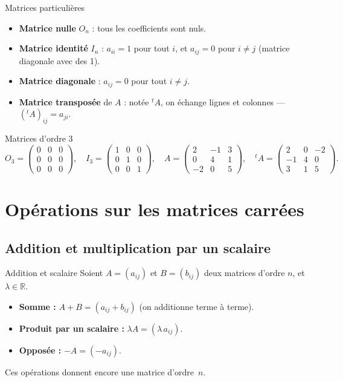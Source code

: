 \begin{definition}{Matrices particulières}
	\begin{itemize}
		\item \textbf{Matrice nulle} $O_n$ : tous les coefficients sont nuls.
		\item \textbf{Matrice identité} $I_n$ : $a_{ii}=1$ pour tout $i$,
		et $a_{ij}=0$ pour $i\neq j$ (matrice diagonale avec des 1).
		\item \textbf{Matrice diagonale} : $a_{ij}=0$ pour tout $i\neq j$.
		\item \textbf{Matrice transposée} de $A$ : notée ${}^tA$, on échange
		lignes et colonnes — $({}^tA)_{ij} = a_{ji}$.
	\end{itemize}
\end{definition}

\begin{exemple}{Matrices d'ordre 3}
	\[
	O_3 = \begin{pmatrix}0&0&0\\0&0&0\\0&0&0\end{pmatrix}, \quad
	I_3 = \begin{pmatrix}1&0&0\\0&1&0\\0&0&1\end{pmatrix}, \quad
	A   = \begin{pmatrix}2&-1&3\\0&4&1\\-2&0&5\end{pmatrix}, \quad
	{}^tA = \begin{pmatrix}2&0&-2\\-1&4&0\\3&1&5\end{pmatrix}.
	\]
\end{exemple}

\section{Opérations sur les matrices carrées}

\subsection{Addition et multiplication par un scalaire}

\begin{propriete}{Addition et scalaire}
	Soient $A=(a_{ij})$ et $B=(b_{ij})$ deux matrices d'ordre $n$,
	et $\lambda \in \mathbb{R}$.
	\begin{itemize}
		\item \textbf{Somme :} $A+B = (a_{ij}+b_{ij})$ \quad
		(on additionne terme à terme).
		\item \textbf{Produit par un scalaire :} $\lambda A = (\lambda\,a_{ij})$.
		\item \textbf{Opposée :} $-A = (-a_{ij})$.
	\end{itemize}
	Ces opérations donnent encore une matrice d'ordre~$n$.
\end{propriete}

